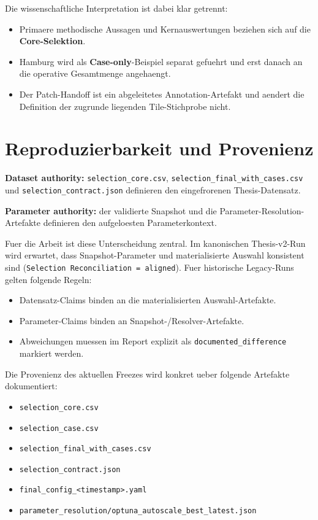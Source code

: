 Die wissenschaftliche Interpretation ist dabei klar getrennt:

\begin{itemize}
    \item Primaere methodische Aussagen und Kernauswertungen beziehen sich auf
          die \textbf{Core-Selektion}.
    \item Hamburg wird als \textbf{Case-only}-Beispiel separat gefuehrt und
          erst danach an die operative Gesamtmenge angehaengt.
    \item Der Patch-Handoff ist ein abgeleitetes Annotation-Artefakt und aendert
          die Definition der zugrunde liegenden Tile-Stichprobe nicht.
\end{itemize}

\section{Reproduzierbarkeit und Provenienz}
\label{sec:reproducibility}

\textbf{Dataset authority:} \verb|selection_core.csv|,
\verb|selection_final_with_cases.csv| und
\verb|selection_contract.json| definieren den eingefrorenen
Thesis-Datensatz.

\textbf{Parameter authority:} der validierte Snapshot und die
Parameter-Resolution-Artefakte definieren den aufgeloesten Parameterkontext.

Fuer die Arbeit ist diese Unterscheidung zentral. Im kanonischen Thesis-v2-Run
wird erwartet, dass Snapshot-Parameter und materialisierte Auswahl konsistent
sind (\texttt{Selection Reconciliation = aligned}). Fuer historische Legacy-Runs
gelten folgende Regeln:

\begin{itemize}
    \item Datensatz-Claims binden an die materialisierten Auswahl-Artefakte.
    \item Parameter-Claims binden an Snapshot-/Resolver-Artefakte.
    \item Abweichungen muessen im Report explizit als
          \texttt{documented\_difference} markiert werden.
\end{itemize}

Die Provenienz des aktuellen Freezes wird konkret ueber folgende Artefakte
dokumentiert:

\begin{itemize}
    \item \verb|selection_core.csv|
    \item \verb|selection_case.csv|
    \item \verb|selection_final_with_cases.csv|
    \item \verb|selection_contract.json|
    \item \verb|final_config_<timestamp>.yaml|
    \item \verb|parameter_resolution/optuna_autoscale_best_latest.json|
\end{itemize}

